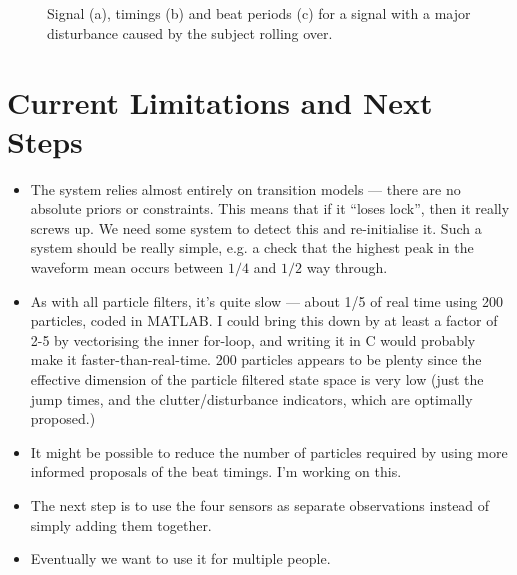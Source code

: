 \documentclass{article}
\begin{document}
\begin{figure}
\centering
{} \\
 \\
\caption{Signal (a), timings (b) and beat periods (c) for a signal with a major disturbance caused by the subject rolling over.}
\label{fig:clutter}
\end{figure}



\section{Current Limitations and Next Steps}

\begin{itemize}
  \item The system relies almost entirely on transition models --- there are no absolute priors or constraints. This means that if it ``loses lock'', then it really screws up. We need some system to detect this and re-initialise it. Such a system should be really simple, e.g. a check that the highest peak in the waveform mean occurs between $1/4$ and $1/2$ way through.
  \item As with all particle filters, it's quite slow --- about 1/5 of real time using 200 particles, coded in MATLAB. I could bring this down by at least a factor of 2-5 by vectorising the inner for-loop, and writing it in C would probably make it faster-than-real-time. 200 particles appears to be plenty since the effective dimension of the particle filtered state space is very low (just the jump times, and the clutter/disturbance indicators, which are optimally proposed.)
  \item It might be possible to reduce the number of particles required by using more informed proposals of the beat timings. I'm working on this.
  \item The next step is to use the four sensors as separate observations instead of simply adding them together.
  \item Eventually we want to use it for multiple people.
\end{itemize}




\end{document}

